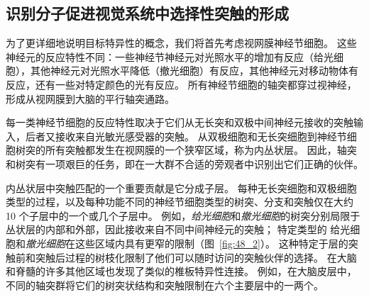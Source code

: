 \subsection{识别分子促进视觉系统中选择性突触的形成}

为了更详细地说明目标特异性的概念，我们将首先考虑视网膜神经节细胞。
这些神经元的反应特性不同：一些神经节神经元对光照水平的增加有反应（给光细胞），其他神经元对光照水平降低（撤光细胞）有反应，其他神经元对移动物体有反应，还有一些对特定颜色的光有反应。
所有神经节细胞的轴突都穿过视神经，形成从视网膜到大脑的平行轴突通路。


每一类神经节细胞的反应特性取决于它们从无长突和双极中间神经元接收的突触输入，后者又接收来自光敏光感受器的突触。
从双极细胞和无长突细胞到神经节细胞树突的所有突触都发生在视网膜的一个狭窄区域，称为内丛状层。
因此，轴突和树突有一项艰巨的任务，即在一大群不合适的旁观者中识别出它们正确的伙伴。


内丛状层中突触匹配的一个重要贡献是它分成子层。
每种无长突细胞和双极细胞类型的过程，以及每种功能不同的神经节细胞类型的树突、分支和突触仅在大约 10 个子层中的一个或几个子层中。
例如，\textit{给光细胞}和\textit{撤光细胞}的树突分别局限于丛状层的内部和外部，因此接收来自不同中间神经元的突触；
特定类型的 给光细胞和\textit{撤光细胞}在这些区域内具有更窄的限制（图~\ref{fig:48_2}）。
这种特定于层的突触前和突触后过程的树枝化限制了他们可以随时访问的突触伙伴的选择。
在大脑和脊髓的许多其他区域也发现了类似的椎板特异性连接。
例如，在大脑皮层中，不同的轴突群将它们的树突状结构和突触限制在六个主要层中的一两个。


